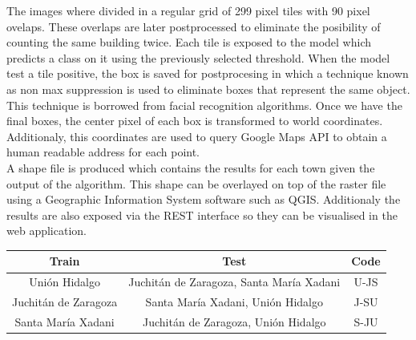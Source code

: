 The images where divided in a regular grid of 299 pixel tiles with 90 pixel ovelaps. These overlaps are later postprocessed to eliminate the posibility of counting the same building twice. Each tile is exposed to the model which predicts a class on it using the previously selected threshold. When the model test a tile positive, the box is saved for postprocesing in which a technique known as non max suppression is used to eliminate boxes that represent the same object. This technique is borrowed from facial recognition algorithms. Once we have the final boxes, the center pixel of each box is transformed to world coordinates. Additionaly, this coordinates are used to query Google Maps API to obtain a human readable address for each point.\\

A shape file is produced which contains the results for each town given the output of the algorithm. This shape can be overlayed on top of the raster file using a Geographic Information System software such as QGIS. Additionaly the results are also exposed via the REST interface so they can be visualised in the web application.\\






\begin{center}
  \begin{tabular}{|c|c|c|}
    \hline
    Train                  &Test                                           &Code \\ \hline
    Uni\'on Hidalgo        &Juchit\'an de Zaragoza, Santa Mar\'ia Xadani   &U-JS \\ \hline
    Juchit\'an de Zaragoza &Santa Mar\'ia Xadani, Uni\'on Hidalgo          &J-SU \\ \hline
    Santa Mar\'ia Xadani   &Juchit\'an de Zaragoza, Uni\'on Hidalgo        &S-JU \\ 
    \hline
  \end{tabular}
\end{center}






